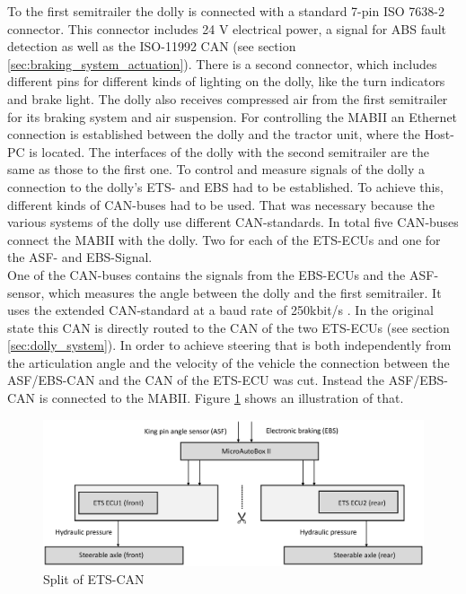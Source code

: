 \documentclass[ExampleMasters.tex]{subfiles}
\begin{document}
To the first semitrailer the dolly is connected with a standard 7-pin ISO 7638-2 connector. This connector includes 24 V electrical power, a signal for \gls{ABS} fault detection as well as the ISO-11992 CAN (see section \ref{sec:braking_system_actuation}).
There is a second connector, which includes different pins for different kinds of lighting on the dolly, like the turn indicators and brake light.
The dolly also receives compressed air from the first semitrailer for its braking system and air suspension.
For controlling the \gls{MABII} an Ethernet connection is established between the dolly and the tractor unit, where the Host-PC is located. 
The interfaces of the dolly with the second semitrailer are the same as those to the first one.  
To control and measure signals of the dolly a connection to the dolly's \gls{ETS}- and \gls{EBS} had to be established. To achieve this, different kinds of \gls{CAN}-buses had to be used. That was necessary because the various systems of the dolly use different \gls{CAN}-standards. In total five \gls{CAN}-buses connect the \gls{MABII} with the dolly. Two for each of the \gls{ETS}-\gls{ECU}s and one for the \gls{ASF}- and \gls{EBS}-Signal.\\


One of the \gls{CAN}-buses contains the signals from the \gls{EBS}-\gls{ECU}s and the \gls{ASF}- sensor, which measures the angle between the dolly and the first semitrailer. It uses the extended \gls{CAN}-standard at a baud rate of 250kbit/s . In the original state this \gls{CAN} is directly routed to the \gls{CAN} of the two \gls{ETS}-\gls{ECU}s (see section \ref{sec:dolly_system}). In order to achieve steering that is both independently from the articulation angle and the velocity of the vehicle the connection between the \gls{ASF}/\gls{EBS}-\gls{CAN} and the \gls{CAN} of the \gls{ETS}-\gls{ECU} was cut. Instead the \gls{ASF}/\gls{EBS}-\gls{CAN} is connected to the \gls{MABII}. Figure \ref{fig:dolly_split} shows an illustration of that.\\

\begin{figure}[!htb]
	\centering
	\includegraphics[width=1\linewidth]{figures/dolly_split}
	\caption[Split of \acrshort{ETS}-\acrshort{CAN}]{Split of \gls{ETS}-\gls{CAN}}
	\label{fig:dolly_split}
\end{figure}  
\end{document}
